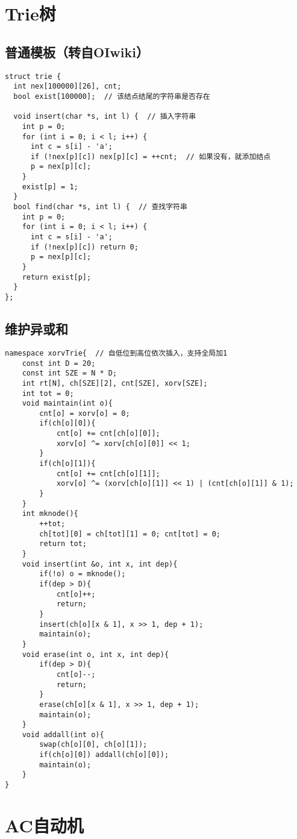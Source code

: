 \section{Trie树}
\subsection{普通模板（转自OIwiki）}
\begin{lstlisting}
struct trie {
  int nex[100000][26], cnt;
  bool exist[100000];  // 该结点结尾的字符串是否存在

  void insert(char *s, int l) {  // 插入字符串
    int p = 0;
    for (int i = 0; i < l; i++) {
      int c = s[i] - 'a';
      if (!nex[p][c]) nex[p][c] = ++cnt;  // 如果没有，就添加结点
      p = nex[p][c];
    }
    exist[p] = 1;
  }
  bool find(char *s, int l) {  // 查找字符串
    int p = 0;
    for (int i = 0; i < l; i++) {
      int c = s[i] - 'a';
      if (!nex[p][c]) return 0;
      p = nex[p][c];
    }
    return exist[p];
  }
};
\end{lstlisting}

\subsection{维护异或和}
\begin{lstlisting}
namespace xorvTrie{  // 自低位到高位依次插入，支持全局加1
    const int D = 20;
    const int SZE = N * D;
    int rt[N], ch[SZE][2], cnt[SZE], xorv[SZE];
    int tot = 0;
    void maintain(int o){
        cnt[o] = xorv[o] = 0;
        if(ch[o][0]){
            cnt[o] += cnt[ch[o][0]];
            xorv[o] ^= xorv[ch[o][0]] << 1;
        }
        if(ch[o][1]){
            cnt[o] += cnt[ch[o][1]];
            xorv[o] ^= (xorv[ch[o][1]] << 1) | (cnt[ch[o][1]] & 1);
        }
    }
    int mknode(){
        ++tot;
        ch[tot][0] = ch[tot][1] = 0; cnt[tot] = 0;
        return tot;
    }
    void insert(int &o, int x, int dep){
        if(!o) o = mknode();
        if(dep > D){
            cnt[o]++;
            return;
        }
        insert(ch[o][x & 1], x >> 1, dep + 1);
        maintain(o);
    }
    void erase(int o, int x, int dep){
        if(dep > D){
            cnt[o]--;
            return;
        }
        erase(ch[o][x & 1], x >> 1, dep + 1);
        maintain(o);
    }
    void addall(int o){
        swap(ch[o][0], ch[o][1]);
        if(ch[o][0]) addall(ch[o][0]);
        maintain(o);
    }
}
\end{lstlisting}

\section{AC自动机}
